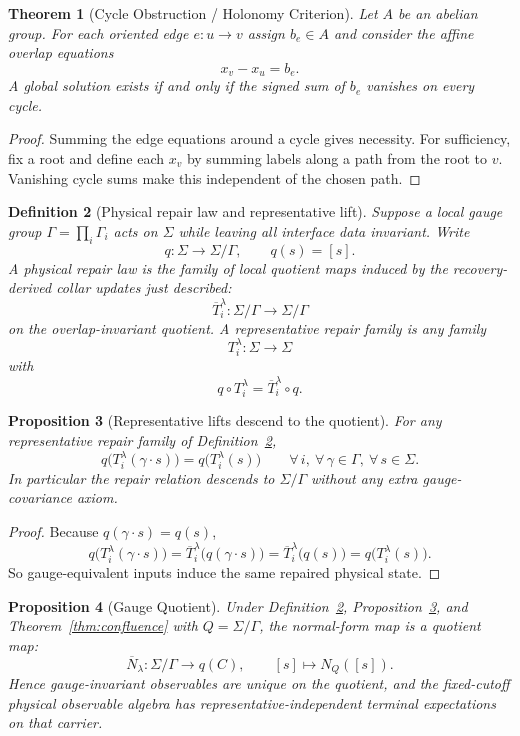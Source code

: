 \documentclass[11pt]{article}
\newtheorem{theorem}{Theorem}[section]
\newtheorem{proposition}[theorem]{Proposition}
\newtheorem{definition}[theorem]{Definition}
\begin{document}
\begin{theorem}[Cycle Obstruction / Holonomy Criterion]\label{thm:holonomy}
Let $A$ be an abelian group. For each oriented edge $e:u\to v$ assign $b_e\in A$ and consider the affine overlap equations
\[
x_v-x_u=b_e.
\]
A global solution exists if and only if the signed sum of $b_e$ vanishes on every cycle.
\end{theorem}

\begin{proof}
Summing the edge equations around a cycle gives necessity. For sufficiency, fix a root and define each $x_v$ by summing labels along a path from the root to $v$. Vanishing cycle sums make this independent of the chosen path.
\end{proof}

\begin{definition}[Physical repair law and representative lift]\label{def:physicalrepair}
Suppose a local gauge group $\Gamma=\prod_i \Gamma_i$ acts on $\Sigma$ while leaving all interface
data invariant. Write
\[
q:\Sigma\to\Sigma/\Gamma,
\qquad
q(s)=[s].
\]
A physical repair law is the family of local quotient maps induced by the
recovery-derived collar updates just described:
\[
\overline T_i^\lambda:\Sigma/\Gamma\to\Sigma/\Gamma
\]
on the overlap-invariant quotient. A representative repair family is any family
\[
T_i^\lambda:\Sigma\to\Sigma
\]
with
\[
q\circ T_i^\lambda=\overline T_i^\lambda\circ q.
\]
\end{definition}

\begin{proposition}[Representative lifts descend to the quotient]\label{prop:repairquot}
For any representative repair family of Definition~\ref{def:physicalrepair},
\[
q\bigl(T_i^\lambda(\gamma\cdot s)\bigr)=q\bigl(T_i^\lambda(s)\bigr)
\qquad
\forall\, i,\ \forall\, \gamma\in\Gamma,\ \forall\, s\in\Sigma.
\]
In particular the repair relation descends to \(\Sigma/\Gamma\) without any extra
gauge-covariance axiom.
\end{proposition}

\begin{proof}
Because \(q(\gamma\cdot s)=q(s)\),
\[
q\bigl(T_i^\lambda(\gamma\cdot s)\bigr)
=
\overline T_i^\lambda\bigl(q(\gamma\cdot s)\bigr)
=
\overline T_i^\lambda\bigl(q(s)\bigr)
=
q\bigl(T_i^\lambda(s)\bigr).
\]
So gauge-equivalent inputs induce the same repaired physical state.
\end{proof}

\begin{proposition}[Gauge Quotient]\label{prop:gauge}
Under Definition~\ref{def:physicalrepair}, Proposition~\ref{prop:repairquot}, and
Theorem~\ref{thm:confluence} with \(Q=\Sigma/\Gamma\), the normal-form map is a quotient map:
\[
\overline N_\lambda:\Sigma/\Gamma\to q(C),
\qquad
[s]\mapsto N_Q([s]).
\]
Hence gauge-invariant observables are unique on the quotient, and the fixed-cutoff physical
observable algebra has representative-independent terminal expectations on that carrier.
\end{proposition}
\end{document}
